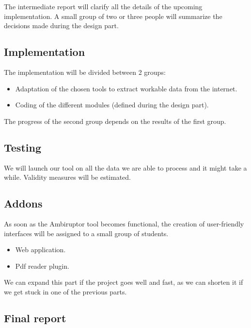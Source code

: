\documentclass[11pt,a4paper]{article}
\begin{document}
The intermediate report will clarify all the details of the upcoming implementation. A small group of two or three people will summarize the decisions made during the design part.

\subsection{Implementation}

The implementation will be divided between 2 groups:
\begin{itemize}
	\item Adaptation of the chosen tools to extract workable data from the internet.
	\item Coding of the different modules (defined during the design part).
\end{itemize}
The progress of the second group depends on the results of the first group.


\subsection{Testing}

We will launch our tool on all the data we are able to process and it might take a while. Validity measures will be estimated.

\subsection{Addons}

As soon as the Ambiruptor tool becomes functional, the creation of user-friendly interfaces will be assigned to a small group of students.
\begin{itemize}
	\item Web application.
	\item Pdf reader plugin.
\end{itemize}
We can expand this part if the project goes well and fast, as we can shorten it if we get stuck in one of the previous parts.


\subsection{Final report}
\end{document}
